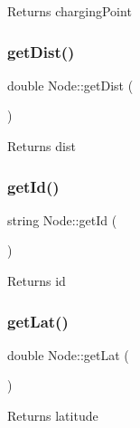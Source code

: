 \begin{DoxyReturn}{Returns}
charging\+Point 
\end{DoxyReturn}
\mbox{\label{class_node_a57980950fdbe58cb696b10f387133474}} 
\subsubsection{\texorpdfstring{get\+Dist()}{getDist()}}
{\footnotesize\ttfamily double Node\+::get\+Dist (\begin{DoxyParamCaption}{ }\end{DoxyParamCaption})\hspace{0.3cm}{\ttfamily [inline]}}

\begin{DoxyReturn}{Returns}
dist 
\end{DoxyReturn}
\mbox{\label{class_node_ad560e18143071e5c5b8eb33d03870e00}} 
\subsubsection{\texorpdfstring{get\+Id()}{getId()}}
{\footnotesize\ttfamily string Node\+::get\+Id (\begin{DoxyParamCaption}{ }\end{DoxyParamCaption})\hspace{0.3cm}{\ttfamily [inline]}}

\begin{DoxyReturn}{Returns}
id 
\end{DoxyReturn}
\mbox{\label{class_node_abad0b37954e52e81581ee1a6055425ce}} 
\subsubsection{\texorpdfstring{get\+Lat()}{getLat()}}
{\footnotesize\ttfamily double Node\+::get\+Lat (\begin{DoxyParamCaption}{ }\end{DoxyParamCaption})\hspace{0.3cm}{\ttfamily [inline]}}

\begin{DoxyReturn}{Returns}
latitude 
\end{DoxyReturn}
\mbox{\label{class_node_a8c7aa3ca64970417959b88e0cd097aa2}} 

